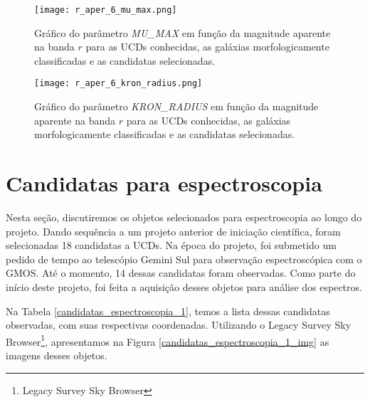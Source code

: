 \begin{figure}[!ht]
    \begin{center}
    \texttt{[image: r\_aper\_6\_mu\_max.png]}
    \caption[]{Gráfico do parâmetro \textit{MU\_MAX} em função da magnitude aparente na banda $r$ para as UCDs conhecidas, as galáxias morfologicamente classificadas e as candidatas selecionadas.}
    \label{r_aper_6_mu_max}
    \end{center}
\end{figure}


\begin{figure}[!ht]
    \begin{center}
    \texttt{[image: r\_aper\_6\_kron\_radius.png]}
    \caption[]{Gráfico do parâmetro \textit{KRON\_RADIUS} em função da magnitude aparente na banda $r$ para as UCDs conhecidas, as galáxias morfologicamente classificadas e as candidatas selecionadas.}
    \label{r_aper_6_kron_radius}
    \end{center}
\end{figure}


\section{Candidatas para espectroscopia}\label{sec:candidatas_espectroscopia}

Nesta seção, discutiremos os objetos selecionados para espectroscopia ao longo do projeto. Dando sequência a um projeto anterior de iniciação científica, foram selecionadas 18 candidatas a UCDs. Na época do projeto, foi submetido um pedido de tempo ao telescópio Gemini Sul para observação espectroscópica com o GMOS. Até o momento, 14 dessas candidatas foram observadas. Como parte do início deste projeto, foi feita a aquisição desses objetos para análise dos espectros.

Na Tabela \ref{candidatas_espectroscopia_1}, temos a lista dessas candidatas observadas, com suas respectivas coordenadas. Utilizando o Legacy Survey Sky Browser\footnote{Legacy Survey Sky Browser}, apresentamos na Figura \ref{candidatas_espectroscopia_1_img} as imagens desses objetos.

